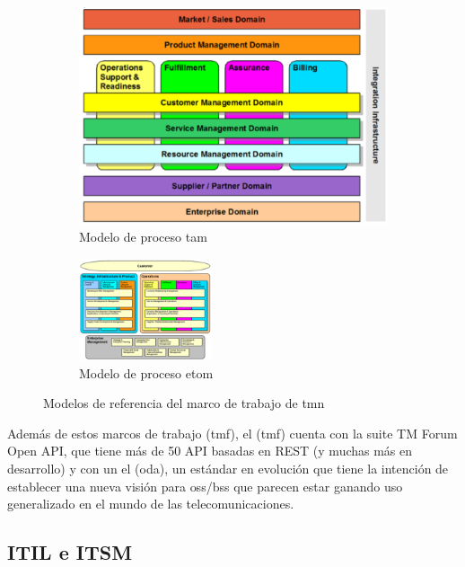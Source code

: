 \begin{figure}[H]
  \centering
  \begin{subfigure}[c]{0.3\textwidth}
    \includegraphics[width=\textwidth]{imaxes/tam.png}
    \caption{Modelo de proceso \acrshort{tam}}
    \label{fig:tam}
  \end{subfigure}
  \hspace{0.1\textwidth}
  \begin{subfigure}[c]{0.3\textwidth}
    \includegraphics[width=\textwidth,height=3cm]{imaxes/etom.png}
    \caption{Modelo de proceso \acrshort{etom}}
    \label{fig:etom}
  \end{subfigure}
  \caption{Modelos de referencia del marco de trabajo de \acrshort{tmn}}
  \label{fig:tam-etom}
\end{figure}


Además de estos marcos de trabajo (\acrshort{tmf}), el (\acrlong{tmf}) cuenta con la suite TM Forum Open API, que tiene más de 50 API basadas en REST (y muchas más en desarrollo) y con un el (\acrfull{oda}), un estándar en evolución que tiene la intención de establecer una nueva visión para \acrshort{oss}/\acrshort{bss} que parecen estar ganando uso generalizado en el mundo de las telecomunicaciones.


\subsection{ITIL e ITSM}

